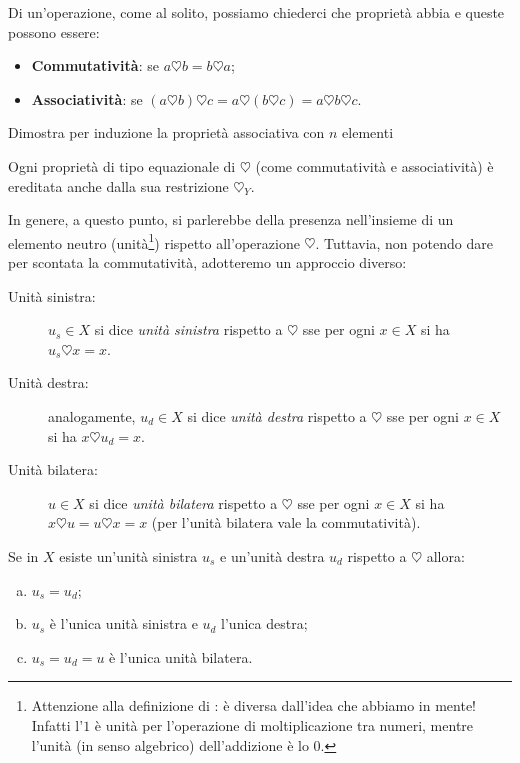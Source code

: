 		Di un'operazione, come al solito, possiamo chiederci che proprietà abbia e queste possono essere:
		\begin{itemize}
			\item \textbf{Commutatività}: se $a\heartsuit b=b\heartsuit a$;
			\item \textbf{Associatività}: se $(a\heartsuit b)\heartsuit c=a\heartsuit( b\heartsuit c) = a\heartsuit b\heartsuit c$.
		\end{itemize}
		\begin{es}
			Dimostra per induzione la proprietà associativa con $n$ elementi
		\end{es}
		\begin{fatto}
			Ogni proprietà di tipo equazionale di $\heartsuit$ (come commutatività e associatività) è ereditata anche dalla sua restrizione $\heartsuit_{Y}$.
		\end{fatto}
		In genere, a questo punto, si parlerebbe della presenza nell'insieme di un elemento neutro (unità\footnote{Attenzione alla definizione di : è diversa dall'idea che abbiamo in mente! Infatti l'$1$ è unità per l'operazione di moltiplicazione tra numeri, mentre l'unità (in senso algebrico) dell'addizione è lo $0$.}) rispetto all'operazione $\heartsuit$. Tuttavia, non potendo dare per scontata la commutatività, adotteremo un approccio diverso:
		\begin{description}
			\item[Unità sinistra:] $u_s\in X$ si dice \emph{unità sinistra} rispetto a $\heartsuit$ sse per ogni $x \in X$ si ha $u_s\heartsuit x=x$.
			\item[Unità destra:] analogamente, $u_d\in X$ si dice \emph{unità destra} rispetto a $\heartsuit$ sse per ogni $x \in X$ si ha $x\heartsuit u_d=x$.
			\item[Unità bilatera:] $u\in X$ si dice \emph{unità bilatera} rispetto a $\heartsuit$ sse per ogni $x \in X$ si ha $x\heartsuit u  = u\heartsuit x=x$ (per l'unità bilatera vale la commutatività).
		\end{description}
		\begin{prop}
			Se in $X$ esiste un'unità sinistra $u_s$ e un'unità destra $u_d$ rispetto a $\heartsuit$ allora:
			\begin{enumerate}[a.]
				\item $u_s=u_d$;
				\item $u_s$ è l'unica unità sinistra e $u_d$ l'unica destra;
				\item $u_s=u_d=u$ è l'unica unità bilatera.
			\end{enumerate}
		\end{prop}

